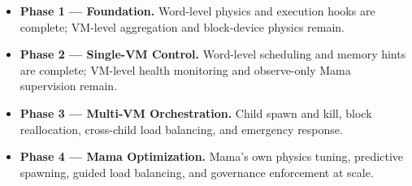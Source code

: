 \begin{itemize}
  \item \textbf{Phase 1 --- Foundation.} Word-level physics and execution hooks
        are complete; VM-level aggregation and block-device physics remain.
  \item \textbf{Phase 2 --- Single-VM Control.} Word-level scheduling and memory
        hints are complete; VM-level health monitoring and observe-only Mama
        supervision remain.
  \item \textbf{Phase 3 --- Multi-VM Orchestration.} Child spawn and kill, block
        reallocation, cross-child load balancing, and emergency response.
  \item \textbf{Phase 4 --- Mama Optimization.} Mama's own physics tuning,
        predictive spawning, guided load balancing, and governance enforcement
        at scale.
\end{itemize}

